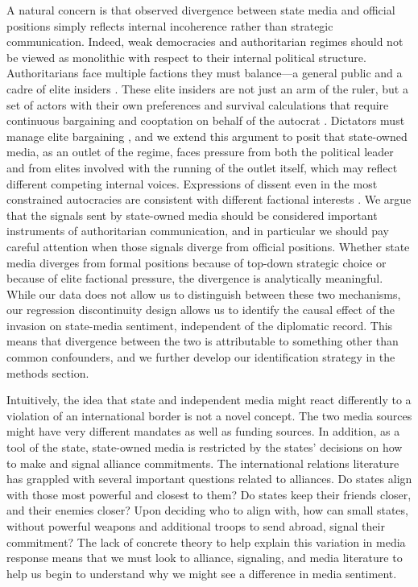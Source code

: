 \documentclass[12pt]{article}
\begin{document}
A natural concern is that observed divergence between state media and official positions simply reflects internal incoherence rather than strategic communication. Indeed, weak democracies and authoritarian regimes should not be viewed as monolithic with respect to their internal political structure. Authoritarians face multiple factions they must balance---a general public and a cadre of elite insiders \citep{svolik_politics_2012}. These elite insiders are not just an arm of the ruler, but a set of actors with their own preferences and survival calculations that require continuous bargaining and cooptation on behalf of the autocrat \citep{bueno_de_mesquita_logic_2003}. Dictators must manage elite bargaining \citep{gandhi_political_2008}, and we extend this argument to posit that state-owned media, as an outlet of the regime, faces pressure from both the political leader and from elites involved with the running of the outlet itself, which may reflect different competing internal voices. Expressions of dissent even in the most constrained autocracies are consistent with different factional interests \citep{malesky_nodding_2010}. We argue that the signals sent by state-owned media should be considered important instruments of authoritarian communication, and in particular we should pay careful attention when those signals diverge from official positions. Whether state media diverges from formal positions because of top-down strategic choice or because of elite factional pressure, the divergence is analytically meaningful. While our data does not allow us to distinguish between these two mechanisms, our regression discontinuity design allows us to identify the causal effect of the invasion on state-media sentiment, independent of the diplomatic record. This means that divergence between the two is attributable to something other than common confounders, and we further develop our identification strategy in the methods section.




Intuitively, the idea that state and independent media might react differently to a violation of an international border is not a novel concept. The two media sources might have very different mandates as well as funding sources. In addition, as a tool of the state, state-owned media is restricted by the states' decisions on how to make and signal alliance commitments. The international relations literature has grappled with several important questions related to alliances. Do states align with those most powerful and closest to them? Do states keep their friends closer, and their enemies closer? Upon deciding who to align with, how can small states, without powerful weapons and additional troops to send abroad, signal their commitment? The lack of concrete theory to help explain this variation in media response means that we must look to alliance, signaling, and media literature to help us begin to understand why we might see a difference in media sentiment. 
\end{document}
